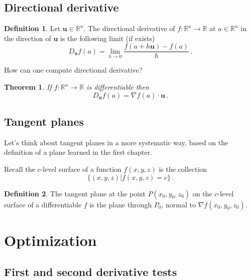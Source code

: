 \documentclass[
]{book}
\newtheorem{theorem}{Theorem}[chapter]
\theoremstyle{definition}
\newtheorem{definition}{Definition}[chapter]
\theoremstyle{definition}
\theoremstyle{definition}
\theoremstyle{definition}
\theoremstyle{remark}
\begin{document}
\section{Directional derivative}\label{directional-derivative}

\begin{definition}
Let \(\mathbf{u} \in \mathbb{R}^n\). The directional derivative of \(f:\mathbb{R}^n \to \mathbb{R}\) at \(a\in \mathbb{R}^n\)
in the direction of \(\mathbf{u}\) is the following limit (if exists)
\begin{equation*}
    D_{\mathbf{u}} f(a) = \lim_{h \to 0} \frac{ f( a + h \mathbf{u}) - f(a)}{h}\,.
\end{equation*}
\end{definition}

How can one compute directional derivative?

\begin{theorem}
If \(f:\mathbb{R}^n \to \mathbb{R}\) is differentiable then
\begin{equation*}
    D_{\mathbf{u}} f(a) = \nabla f(a) \cdot \mathbf{u} \,.
\end{equation*}
\end{theorem}

\section{Tangent planes}\label{tangent-planes}

Let's think about tangent planes in a more systematic way, based on the definition
of a plane learned in the first chapter.

Recall the \(c\)-level surface of a function \(f(x,y,z)\) is the collection
\begin{equation*}
    \{ (x,y,z) | f(x,y,z) = c \} \,.
\end{equation*}

\begin{definition}
The tangent plane at the point \(P(x_0, y_0, z_0)\) on the \(c\)-level surface of a differentiable \(f\)
is the plane through \(P_0\), normal to \(\nabla f (x_0, y_0, z_0)\).
\end{definition}

\newpage

\chapter{Optimization}\label{optimization}

\section{First and second derivative tests}\label{first-and-second-derivative-tests}
\end{document}
